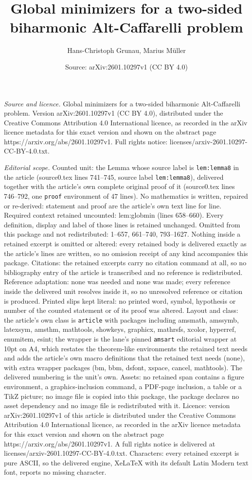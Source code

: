 \documentclass[10pt,a4paper]{amsart}
\title[Global minimizers for a two-sided biharmonic Alt-Caffarelli ]{Global minimizers for a two-sided biharmonic Alt-Caffarelli problem}
\author{Hans-Christoph Grunau, Marius M\"uller}
\date{Source: arXiv:2601.10297v1 (CC BY 4.0)}
\begin{document}
\maketitle

\noindent\emph{Source and licence.} Global minimizers for a two-sided biharmonic Alt-Caffarelli problem. Version arXiv:2601.10297v1 (CC BY 4.0), distributed under the Creative Commons Attribution 4.0 International licence, as recorded in the arXiv licence metadata for this exact version and shown on the abstract page https://arxiv.org/abs/2601.10297v1. Full rights notice: licenses/arxiv-2601.10297-CC-BY-4.0.txt.\par\smallskip

\noindent\textit{Editorial scope.} Counted unit: the Lemma whose source label is \texttt{lem:lemma8} in the article (source0.tex lines 741--745, source label \texttt{lem:lemma8}), delivered together with the article's own complete original proof of it (source0.tex lines 746--792, one \texttt{proof} environment of 47 lines). No mathematics is written, repaired or re-derived: statement and proof are the article's own text line for line. Required context retained uncounted: lem:globmin (lines 658--660). Every definition, display and label of those lines is retained unchanged. Omitted from this package and not redistributed: 1--657, 661--740, 793--1627. Nothing inside a retained excerpt is omitted or altered: every retained body is delivered exactly as the article's lines are written, so no omission receipt of any kind accompanies this package. Citations: the retained excerpts carry no citation command at all, so no bibliography entry of the article is transcribed and no reference is redistributed. Reference adaptation: none was needed and none was made; every reference inside the delivered unit resolves inside it, so no unresolved reference or citation is produced. Printed slips kept literal: no printed word, symbol, hypothesis or number of the counted statement or of its proof was altered. Layout and class: the article's own class is \texttt{article} with packages including amsmath, amssymb, latexsym, amsthm, mathtools, showkeys, graphicx, mathrsfs, xcolor, hyperref, enumitem, esint; the wrapper is the lane's pinned \texttt{amsart} editorial wrapper at 10pt on A4, which restates the theorem-like environments the retained text needs and adds the article's own macro definitions that the retained text needs (none), with extra wrapper packages (bm, bbm, dsfont, xspace, cancel, mathtools). The delivered numbering is the unit's own. Assets: no retained span contains a figure environment, a graphics-inclusion command, a PDF-page inclusion, a table or a TikZ picture; no image file is copied into this package, the package declares no asset dependency and no image file is redistributed with it. Licence: version arXiv:2601.10297v1 of this article is distributed under the Creative Commons Attribution 4.0 International licence, as recorded in the arXiv licence metadata for this exact version and shown on the abstract page https://arxiv.org/abs/2601.10297v1. A full rights notice is delivered at licenses/arxiv-2601.10297-CC-BY-4.0.txt. Characters: every retained excerpt is pure ASCII, so the delivered engine, XeLaTeX with its default Latin Modern text font, reports no missing character.
\end{document}
